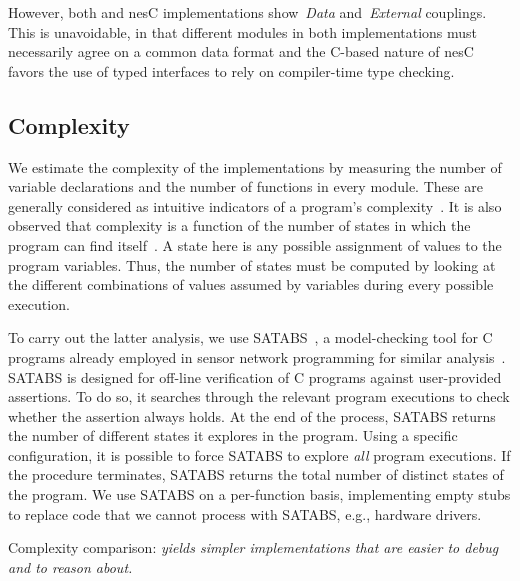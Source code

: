 However, both \conesc and nesC implementations show~\emph{Data}
and~\emph{External} couplings. This is unavoidable, in that different
modules in both implementations must necessarily agree on a common
data format and the C-based nature of nesC favors the use of typed
interfaces to rely on compiler-time type checking.


\subsection{Complexity}\label{sec:complexity}

We estimate the complexity of the implementations by measuring the
number of variable declarations and the number of functions in every
module. These are generally considered as intuitive indicators of a
program's complexity~\cite{pressman01}. It is also observed that
complexity is a function of the number of states in which the program
can find itself~\cite{35}. A state here is any possible assignment of
values to the program variables. Thus, the number of states must be
computed by looking at the different combinations of values assumed by
variables during every possible execution.

To carry out the latter analysis, we use SATABS~\cite{satabs}, a
model-checking tool for C programs already employed in sensor network
programming for similar analysis~\cite{mottola11survey}. SATABS is
designed for off-line verification of C programs against user-provided
assertions. To do so, it searches through the relevant program
executions to check whether the assertion always holds. At the end of
the process, SATABS returns the number of different states it explores
in the program.  Using a specific configuration, it is possible to
force SATABS to explore \emph{all} program executions. If the
procedure terminates, SATABS returns the total number of distinct
states of the program. We use SATABS on a per-function basis,
implementing empty stubs to replace code that we cannot process with
SATABS, e.g., hardware drivers.

\begin{table}[!tb]
\renewcommand{\arraystretch}{1.3}
\caption{Complexity comparison: \emph{\conesc yields simpler implementations that are easier to debug and to reason about.}}
\label{tab:compres}

\end{table}

